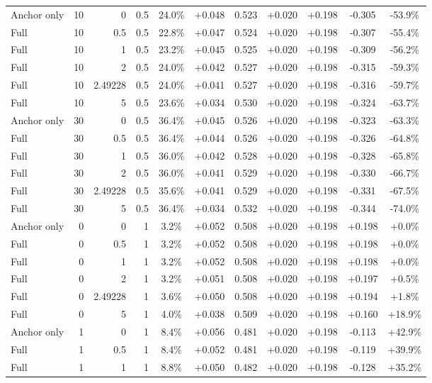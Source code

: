 \begin{table}[htbp]
\begin{tabular}{lrrrccccccc}
Anchor only & 10 & 0 & 0.5 & 24.0\% & +0.048 & 0.523 & +0.020 & +0.198 & -0.305 & -53.9\% \\
Full & 10 & 0.5 & 0.5 & 22.8\% & +0.047 & 0.524 & +0.020 & +0.198 & -0.307 & -55.4\% \\
Full & 10 & 1 & 0.5 & 23.2\% & +0.045 & 0.525 & +0.020 & +0.198 & -0.309 & -56.2\% \\
Full & 10 & 2 & 0.5 & 24.0\% & +0.042 & 0.527 & +0.020 & +0.198 & -0.315 & -59.3\% \\
Full & 10 & 2.49228 & 0.5 & 24.0\% & +0.041 & 0.527 & +0.020 & +0.198 & -0.316 & -59.7\% \\
Full & 10 & 5 & 0.5 & 23.6\% & +0.034 & 0.530 & +0.020 & +0.198 & -0.324 & -63.7\% \\
Anchor only & 30 & 0 & 0.5 & 36.4\% & +0.045 & 0.526 & +0.020 & +0.198 & -0.323 & -63.3\% \\
Full & 30 & 0.5 & 0.5 & 36.4\% & +0.044 & 0.526 & +0.020 & +0.198 & -0.326 & -64.8\% \\
Full & 30 & 1 & 0.5 & 36.0\% & +0.042 & 0.528 & +0.020 & +0.198 & -0.328 & -65.8\% \\
Full & 30 & 2 & 0.5 & 36.0\% & +0.041 & 0.529 & +0.020 & +0.198 & -0.330 & -66.7\% \\
Full & 30 & 2.49228 & 0.5 & 35.6\% & +0.041 & 0.529 & +0.020 & +0.198 & -0.331 & -67.5\% \\
Full & 30 & 5 & 0.5 & 36.4\% & +0.034 & 0.532 & +0.020 & +0.198 & -0.344 & -74.0\% \\
Anchor only & 0 & 0 & 1 & 3.2\% & +0.052 & 0.508 & +0.020 & +0.198 & +0.198 & +0.0\% \\
Full & 0 & 0.5 & 1 & 3.2\% & +0.052 & 0.508 & +0.020 & +0.198 & +0.198 & +0.0\% \\
Full & 0 & 1 & 1 & 3.2\% & +0.052 & 0.508 & +0.020 & +0.198 & +0.198 & +0.0\% \\
Full & 0 & 2 & 1 & 3.2\% & +0.051 & 0.508 & +0.020 & +0.198 & +0.197 & +0.5\% \\
Full & 0 & 2.49228 & 1 & 3.6\% & +0.050 & 0.508 & +0.020 & +0.198 & +0.194 & +1.8\% \\
Full & 0 & 5 & 1 & 4.0\% & +0.038 & 0.509 & +0.020 & +0.198 & +0.160 & +18.9\% \\
Anchor only & 1 & 0 & 1 & 8.4\% & +0.056 & 0.481 & +0.020 & +0.198 & -0.113 & +42.9\% \\
Full & 1 & 0.5 & 1 & 8.4\% & +0.052 & 0.481 & +0.020 & +0.198 & -0.119 & +39.9\% \\
Full & 1 & 1 & 1 & 8.8\% & +0.050 & 0.482 & +0.020 & +0.198 & -0.128 & +35.2\% \\

\end{tabular}
\end{table}
